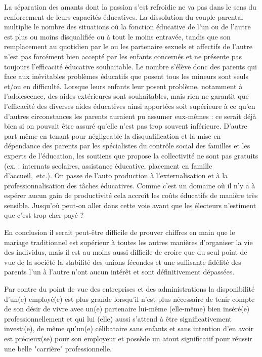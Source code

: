 La séparation des amants dont la passion s'est refroidie ne va pas dans le sens du renforcement de leurs capacités éducatives. La dissolution du couple parental multiplie le nombre des situations où la fonction éducative de l'un ou de l'autre est plus ou moins disqualifiée ou à tout le moins entravée, tandis que son remplacement au quotidien par le ou les partenaire sexuels et affectifs de l'autre n'est pas forcément bien accepté par les enfants concernés et ne présente pas toujours l'efficacité éducative souhaitable. Le nombre s'élève donc des parents qui face aux inévitables problèmes éducatifs que posent tous les mineurs sont seuls et/ou en difficulté. Lorsque leurs enfants leur posent problème, notamment à l'adolescence, des aides extérieures sont souhaitables, mais rien ne garantit que l'efficacité des diverses aides éducatives ainsi apportées soit supérieure à ce qu'en d'autres circonstances les parents auraient pu assumer eux-mêmes : ce serait déjà bien si on pouvait être assuré qu'elle n’est pas trop souvent inférieure. D'autre part même en tenant pour négligeable la disqualification et la mise en dépendance des parents par les spécialistes du contrôle social des familles et les experts de l'éducation, les soutiens que propose la collectivité ne sont pas gratuits (ex. :  internats scolaires, assistance éducative, placement en famille d'accueil,~etc.). On passe de l'auto production à l’externalisation et à la professionnalisation des tâches éducatives. Comme c'est un domaine où il n'y a à espérer aucun gain de productivité cela accroît les coûts éducatifs de manière très sensible. Jusqu'où peut-on aller dans cette voie avant que les électeurs n'estiment que c'est trop cher payé ?
 
En conclusion il serait peut-être difficile de prouver chiffres en main que le mariage traditionnel est supérieur à toutes les autres manières d'organiser la vie des individus, mais il est au moins aussi difficile de croire que du seul point de vue de la société la stabilité des unions fécondes et une suffisante fidélité des parents l’un à l’autre n'ont aucun intérêt  et sont définitivement dépassées. 

Par contre du point de vue des entreprises et des administrations la disponibilité d'un(e) employé(e) est plus grande lorsqu'il n'est plus nécessaire de tenir compte de son désir de vivre avec un(e) partenaire lui-même (elle-même) bien inséré(e) professionnellement et qui lui (elle) aussi s'attend à être significativement investi(e), de même qu'un(e) célibataire sans enfants et sans intention d'en avoir est précieux(se) pour son employeur et possède un atout significatif pour réussir une belle "carrière" professionnelle.


